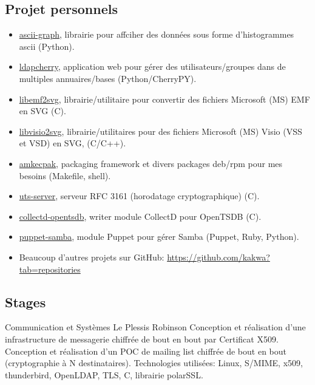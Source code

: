 \documentclass[10pt,a4paper,sans]{moderncv}        %
\begin{document}
\subsection{Projet personnels}
              {}
              {}
              {}
              {
                \begin{itemize}
                \item \href{https://github.com/kakwa/py-ascii-graph}{ascii-graph}, librairie pour affciher des données sous forme d'histogrammes ascii (Python).
                \item \href{https://github.com/kakwa/ldapcherry}{ldapcherry}, application web pour gérer des utilisateurs/groupes dans de multiples annuaires/bases (Python/CherryPY).
                \item \href{https://github.com/kakwa/libemf2svg}{libemf2svg}, librairie/utilitaire pour convertir des fichiers Microsoft (MS) EMF en SVG (C).
                \item \href{https://github.com/kakwa/libvisio2svg}{libvisio2svg}, librairie/utilitaires pour des fichiers Microsoft (MS) Visio (VSS et VSD) en SVG, (C/C++).
                \item \href{https://github.com/kakwa/amkecpak}{amkecpak}, packaging framework et divers packages deb/rpm pour mes besoins (Makefile, shell).
                \item \href{https://github.com/kakwa/uts-server}{uts-server}, serveur RFC 3161 (horodatage cryptographique) (C).
                \item \href{https://github.com/kakwa/collectd-opentsdb}{collectd-opentsdb}, writer module CollectD pour OpenTSDB (C).
                \item \href{https://github.com/kakwa/puppet-samba}{puppet-samba}, module Puppet pour gérer Samba (Puppet, Ruby, Python).
                \item Beaucoup d'autres projets sur GitHub: \url{https://github.com/kakwa?tab=repositories}
                \end{itemize}
}

\subsection{Stages}

              {Communication et Systèmes}
              {Le Plessis Robinson}
              {}
              {Conception et réalisation d'une infrastructure de messagerie chiffrée de bout en bout par
               Certificat X509. Conception et réalisation d'un POC de mailing list chiffrée de bout en bout
               (cryptographie à N destinataires).
               \newline Technologies utilisées: Linux, S/MIME, x509, thunderbird, OpenLDAP, TLS, C, librairie polarSSL.
              }
\end{document}
